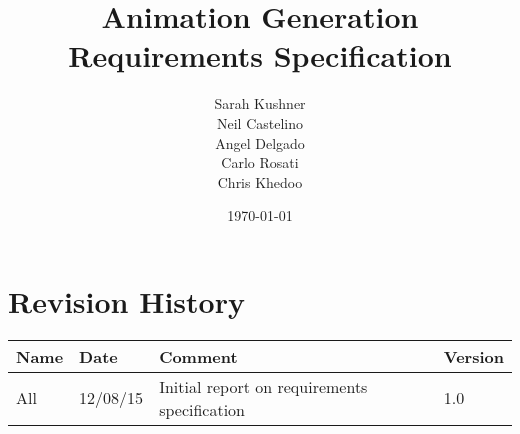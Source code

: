 \documentclass[a4paper]{article}
\begin{document}
\title{Animation Generation Requirements Specification}
\author{Sarah Kushner \\
		Neil Castelino \\
		Angel Delgado \\
		Carlo Rosati \\
		Chris Khedoo}
\date{\today}
\maketitle
\small

\pagebreak
\tableofcontents
\pagebreak
\section{Revision History}
\begin{tabular}{|l|l|l|l|}
\hline
Name	& Date	 		& 	Comment	 								& 	Version	 \\ \hline
All		& 12/08/15		& 	Initial report on requirements specification &  	1.0 	 \\ \hline
\end{tabular}

\pagebreak





\appendix
    
    
\end{document}
